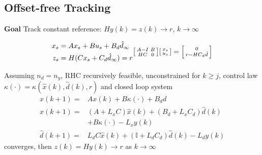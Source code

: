 \subsection{Offset-free Tracking}

\textbf{Goal}
Track constant reference:
$Hy(k) = z(k) \to r$, $k\to\infty$

\begin{align*}
	\begin{aligned}
		x_s & = Ax_s + Bu_s +B_d\hat{d}_\infty  \\
		z_s & = H(Cx_s + C_d\hat{d}_\infty) = r
	\end{aligned}
	\begin{aligned}
		\begin{bsmallmatrix}
			A-I & B \\
			HC  & 0
		\end{bsmallmatrix}
		\begin{bsmallmatrix}
			x_s \\
			u_s
		\end{bsmallmatrix}
		=
		\begin{bsmallmatrix}
			0 \\
			r-HC_d\hat{d}
		\end{bsmallmatrix}
	\end{aligned}
\end{align*}




\begin{theorem}
	Assuming
	$n_d = n_y$,
	RHC recursively feasible,
	unconstrained for $k \geq j$,
	control law  $\kappa(\cdot)= \kappa(\hat{x}(k),\hat{d}(k),r)$
	and closed loop system
	\begin{align*}
		x(k+1)        = & Ax(k) + B\kappa(\cdot) + B_d d                                 \\
		\hat{x}(k+1)  = & (A + L_x C)\hat{x}(k) + (B_d + L_x C_d)\hat{d}(k)              \\
		                & + B\kappa(\cdot) - L_x y(k)                                    \\
		\hat{d}(k+1)  = & L_d C \hat{x}(k) + (\mathbb{I} + L_d C_d)\hat{d}(k) - L_d y(k)
	\end{align*}
	converges, then $z(k) = Hy(k) \to r$
	as $k\to\infty$
\end{theorem}

